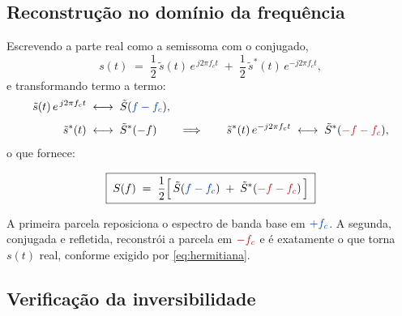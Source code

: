 \documentclass[11pt,a4paper]{article}
\begin{document}
\subsection{Reconstrução no domínio da frequência}

Escrevendo a parte real como a semissoma com o conjugado,
\begin{equation}
  s(t) \;=\; \frac{1}{2}\,\tilde{s}(t)\, e^{\,j2\pi f_c t} \;+\; \frac{1}{2}\,\tilde{s}^{*}(t)\, e^{-j2\pi f_c t},
  \label{eq:semissoma}
\end{equation}
e transformando termo a termo:
\begin{align}
  \tilde{s}(t)\, e^{\,j2\pi f_c t}
  &\;\longleftrightarrow\; \tilde{S}(\textcolor{azul}{f-f_c}),
  \label{eq:freq_passo1}\\[0.4em]
  \tilde{s}^{*}(t)
  &\;\longleftrightarrow\; \tilde{S}^{*}(-f)
  \qquad\Longrightarrow\qquad
  \tilde{s}^{*}(t)\, e^{-j2\pi f_c t} \;\longleftrightarrow\; \tilde{S}^{*}(\textcolor{vermelho}{-f-f_c}),
  \label{eq:freq_passo2}
\end{align}
o que fornece:

\begin{quadro}
\[
  \boxed{\;S(f) \;=\; \frac{1}{2}\Bigl[\, \tilde{S}(\textcolor{azul}{f-f_c}) \;+\; \tilde{S}^{*}(\textcolor{vermelho}{-f-f_c}) \,\Bigr]\;}
\]
\end{quadro}

A primeira parcela reposiciona o espectro de banda base em $\textcolor{azul}{+f_c}$. A segunda, conjugada e refletida, reconstrói a parcela em $\textcolor{vermelho}{-f_c}$ e é exatamente o que torna $s(t)$ real, conforme exigido por \eqref{eq:hermitiana}.

\subsection{Verificação da inversibilidade}
\end{document}

